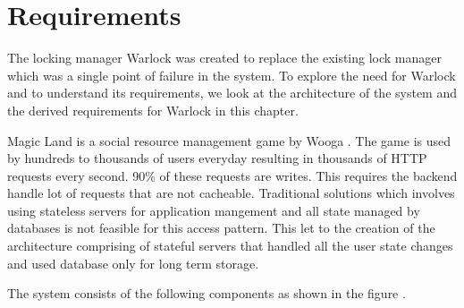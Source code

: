 \chapter{Requirements}
\label{chapter:requirements}

The locking manager Warlock was created to replace the existing lock manager
which was a single point of failure in the system. To explore the need for
Warlock and to understand its requirements, we look at the architecture of
the system and the derived requirements for Warlock in this chapter.

Magic Land \citep{magicland} is a social%
resource management game by Wooga%
. The game is used by hundreds to thousands of users everyday resulting in
thousands of HTTP requests every second. 90\% of these requests are writes.
This requires the backend%
handle lot of requests that are not cacheable. Traditional solutions which
involves using stateless servers for application mangement and all state managed
by databases is not feasible for this access pattern. This let to the creation
of the architecture comprising of stateful servers that handled all the user
state changes and used database only for long term storage.

The system consists of the following components as shown in the figure 
.

